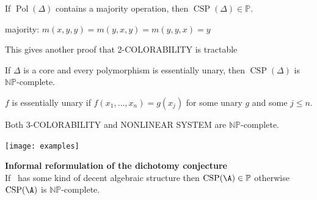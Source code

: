 \documentclass[12pt,xcolor=dvipsnames,handout
   ]{beamer}
\DeclareMathOperator{\CSP}{CSP}
\DeclareMathOperator{\Pol}{Pol}
\renewcommand{\.}{\cdot}
\newcommand{\NP}{\ensuremath{\mathbb{NP}}\xspace}
\renewcommand{\P}{\ensuremath{\mathbb{P}}\xspace}
\let\origtextbf=\textbf
\let\emph=\alert
\renewcommand{\textbf}[1]{{\usebeamercolor[fg]{example text}%
     \origtextbf{#1}}}
\begin{document}
\begin{frame}
  \begin{theorem}
    If $\Pol(\Delta)$ contains a majority operation, then $\CSP(\Delta)
    \in \P$. 
  \end{theorem}

  majority: $m(x,y,y) = m (y,x,y) = m(y,y,x) = y$

  This gives another proof that 2-COLORABILITY is tractable
\end{frame}

\begin{frame}
  \begin{theorem}
    If $\Delta$ is a core and every polymorphism is essentially unary,
    then $\CSP(\Delta)$ is \NP-complete.
  \end{theorem}

  $f$ is \emph{essentially unary} if $f(x_1,\dots,x_n) = g(x_j)$ for
  some unary $g$ and some $j\leq n$.

 \pause
 \begin{corollary}
    Both 3-COLORABILITY and NONLINEAR SYSTEM are \NP-complete.
  \end{corollary}
\end{frame}

\begin{frame}
  \begin{center}
    \texttt{[image: examples]}
  \end{center}


  \textbf{Informal reformulation of the dichotomy conjecture}\\
  If \A\ has some
  kind of decent algebraic structure then $\CSP(\A) \in \P$ otherwise
  $\CSP(\A)$ is \NP-complete.
\end{frame}

\end{document}
